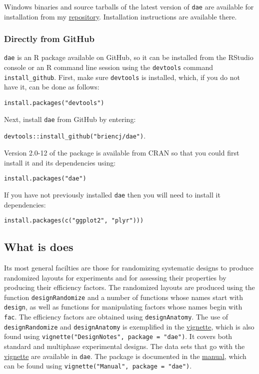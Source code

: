 \documentclass[
]{article}
\begin{document}
Windows binaries and source tarballs of the latest version of
\texttt{dae} are available for installation from my
\href{http://chris.brien.name/rpackages}{repository}. Installation
instructions are available there.

\hypertarget{directly-from-github}{%
\subsubsection{Directly from GitHub}\label{directly-from-github}}

\texttt{dae} is an R package available on GitHub, so it can be installed
from the RStudio console or an R command line session using the
\texttt{devtools} command \texttt{install\_github}. First, make sure
\texttt{devtools} is installed, which, if you do not have it, can be
done as follows:

\texttt{install.packages("devtools")}

Next, install \texttt{dae} from GitHub by entering:

\texttt{devtools::install\_github("briencj/dae")}.

Version 2.0-12 of the package is available from CRAN so that you could
first install it and its dependencies using:

\texttt{install.packages("dae")}

If you have not previously installed \texttt{dae} then you will need to
install it dependencies:

\texttt{install.packages(c("ggplot2",\ "plyr")))}

\hypertarget{what-is-does}{%
\subsection{What is does}\label{what-is-does}}

Its most general facilties are those for randomizing systematic designs
to produce randomized layouts for experiments and for assessing their
properties by producing their efficiency factors. The randomized layouts
are produced using the function \texttt{designRandomize} and a number of
functions whose names start with \texttt{design}, as well as functions
for manipulating factors whose names begin with \texttt{fac}. The
efficiency factors are obtained using \texttt{designAnatomy}. The use of
\texttt{designRandomize} and \texttt{designAnatomy} is exemplified in
the \href{./vignettes/DesignNotes.pdf}{vignette}, which is also found
using \texttt{vignette("DesignNotes",\ package\ =\ "dae")}. It covers
both standard and multiphase experimental designs. The data sets that go
with the \href{./vignettes/DesignNotes.pdf}{vignette} are available in
\texttt{dae}. The package is documented in the
\href{./vignettes/dae-manual.pdf}{manual}, which can be found using
\texttt{vignette("Manual",\ package\ =\ "dae")}.
\end{document}
